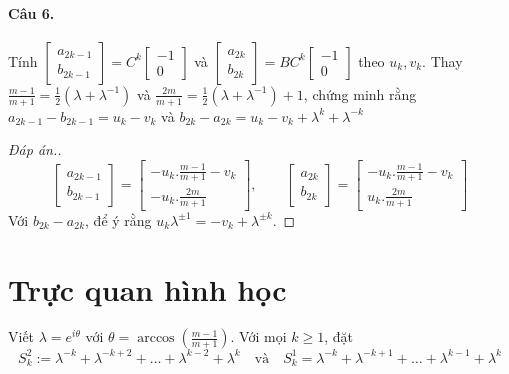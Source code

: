 \documentclass[11pt]{article}
\begin{document}
\paragraph{Câu 6.}
\label{sec:org0f2208f}
Tính \(\begin{bmatrix} a_{2k-1}\\b_{2k-1} \end{bmatrix} = C^k \begin{bmatrix} -1\\0
\end{bmatrix}\) và \(\begin{bmatrix} a_{2k}\\b_{2k} \end{bmatrix} = BC^k \begin{bmatrix} -1\\0
\end{bmatrix}\) theo \(u_k, v_k\). Thay \(\frac{m-1}{m+1} = \frac{1}{2}(\lambda + \lambda^{-1})\)
và \(\frac{2m}{m+1} = \frac{1}{2}(\lambda + \lambda^{-1}) + 1\), chứng minh rằng \(a_{2k-1} - b_{2k-1} = u_k - v_k\) và \(b_{2k} - a_{2k} = u_k - v_k +\lambda^k + \lambda^{-k}\)
\begin{proof}[Đáp án.]
\begin{equation*}
 \begin{bmatrix} a_{2k-1}\\b_{2k-1} \end{bmatrix}   = \begin{bmatrix} -u_k.\frac{m-1}{m+1} -
v_k\\-u_k.\frac{2m}{m+1} \end{bmatrix}, \qquad \begin{bmatrix} a_{2k}\\b_{2k} \end{bmatrix}=  \begin{bmatrix} -u_k.\frac{m-1}{m+1} -
v_k\\u_k.\frac{2m}{m+1} \end{bmatrix}
\end{equation*}
Với \(b_{2k} - a_{2k}\), để ý rằng \(u_k\lambda^{\pm 1} = -v_k + \lambda^{\pm k}\).
\end{proof}

\section*{Trực quan hình học}
\label{sec:org735e1e5}

Viết \(\lambda = e^{i\theta}\) với \(\theta =
 \arccos(\frac{m-1}{m+1})\).  Với mọi \(k\geq 1\), đặt
\[
S^2_k:= \lambda^{-k} + \lambda^{-k+2} + \dots + \lambda^{k-2} + \lambda^k\quad \text{và}\quad S^1_k = \lambda^{-k} + \lambda^{-k+1} + \dots + \lambda^{k-1} + \lambda^k
\]
\end{document}
